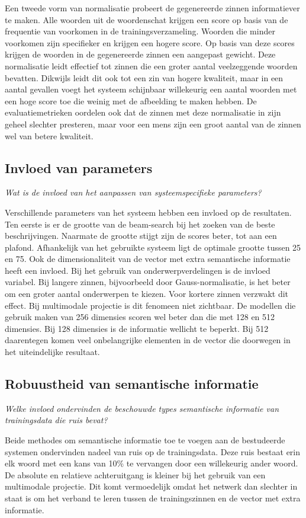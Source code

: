 Een tweede vorm van normalisatie probeert de gegenereerde zinnen informatiever te maken. Alle woorden uit de woordenschat krijgen een score op basis van de frequentie van voorkomen in de trainingsverzameling. Woorden die minder voorkomen zijn specifieker en krijgen een hogere score. Op basis van deze scores krijgen de woorden in de gegenereerde zinnen een aangepast gewicht. Deze normalisatie leidt effectief tot zinnen die een groter aantal veelzeggende woorden bevatten. Dikwijls leidt dit ook tot een zin van hogere kwaliteit, maar in een aantal gevallen voegt het systeem schijnbaar willekeurig een aantal woorden met een hoge score toe die weinig met de afbeelding te maken hebben. De evaluatiemetrieken oordelen ook dat de zinnen met deze normalisatie in zijn geheel slechter presteren, maar voor een mens zijn een groot aantal van de zinnen wel van betere kwaliteit.

\subsection{Invloed van parameters}
\emph{Wat is de invloed van het aanpassen van systeemspecifieke parameters?}

Verschillende parameters van het systeem hebben een invloed op de resultaten. Ten eerste is er de grootte van de beam-search bij het zoeken van de beste beschrijvingen. Naarmate de grootte stijgt zijn de scores beter, tot aan een plafond. Afhankelijk van het gebruikte systeem ligt de optimale grootte tussen 25 en 75. Ook de dimensionaliteit van de vector met extra semantische informatie heeft een invloed. Bij het gebruik van onderwerpverdelingen is de invloed variabel. Bij langere zinnen, bijvoorbeeld door Gauss-normalisatie, is het beter om een groter aantal onderwerpen te kiezen. Voor kortere zinnen verzwakt dit effect. Bij multimodale projectie is dit fenomeen niet zichtbaar. De modellen die gebruik maken van 256 dimensies scoren wel beter dan die met 128 en 512 dimensies. Bij 128 dimensies is de informatie wellicht te beperkt. Bij 512 daarentegen komen veel onbelangrijke elementen in de vector die doorwegen in het uiteindelijke resultaat.

\subsection{Robuustheid van semantische informatie}
\emph{Welke invloed ondervinden de beschouwde types semantische informatie van trainingsdata die ruis bevat?}

Beide methodes om semantische informatie toe te voegen aan de bestudeerde systemen ondervinden nadeel van ruis op de trainingsdata. Deze ruis bestaat erin elk woord met een kans van 10\% te vervangen door een willekeurig ander woord. De absolute en relatieve achteruitgang is kleiner bij het gebruik van een multimodale projectie. Dit komt vermoedelijk omdat het netwerk dan slechter in staat is om het verband te leren tussen de trainingszinnen en de vector met extra informatie.

